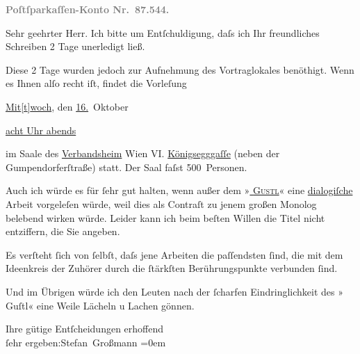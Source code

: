 \pstart
           \textcolor{gray}{\textbf{Poſtſparkaſſen-Konto Nr. 87.544.}}\pend
           
\pstart\center{}Sehr geehrter Herr.\pend\vspace{0.5em}
\pstart
           Ich bitte um Entſchuldigung, daſs ich Ihr freundliches Schreiben 2 Tage unerledigt
               ließ.\pend
           
\pstart
           Diese 2 Tage wurden jedoch zur Aufnehmung des Vortraglokales benöthigt. Wenn es Ihnen
               alſo recht iſt, findet die Vorleſung\pend
           
\pstart
           \centering{}\uline{Mit{[}t{]}woch}, den \uline{16.} Oktober\pend
           
\pstart
           \centering{}\uline{acht Uhr abends}\pend
           
\pstart
           im Saale des \uline{Verbandsheim}{ }Wien VI. \uline{Königsegggaſſe} (neben der Gumpendorferſtraße) statt. Der
               Saal faſst 500 Personen.\pend
           
\pstart
           Auch ich würde es für ſehr gut halten, wenn außer {\pb}dem »\textsc{\uline{\label{T_L01717-1v}\label{T_L01717-1}}}\textsc{\uline{{ }Gustl}}« eine \uline{dialogiſche} Arbeit vorgeleſen würde, weil
               dies als Contraſt zu jenem großen  Monolog
               belebend wirken würde. Leider kann ich beim beſten Willen die  Titel nicht entziffern, die Sie angeben.\pend
           
\pstart
           Es verſteht ſich von ſelbſt, daſs jene Arbeiten die paſſendsten ſind, die mit dem
               Ideenkreis der Zuhörer \introOben{}durch\introOben{} die ſtärkſten  Berührungspunkte verbunden ſind.\pend
           
\pstart
           Und im Übrigen würde ich den Leuten nach der ſcharfen Eindringlichkeit des »\label{T_L01717-2v}\label{T_L01717-2} Guſtl«
               eine  Weile Lächeln u Lachen gönnen.\pend
           
\pstart
           Ihre gütige Entſcheidungen erhoffend{\\[\baselineskip]}ſehr ergeben:\spacefill\mbox{Stefan
                  Großmann}\pend
           \leftskip=0em{}\endnumbering{}  
      
